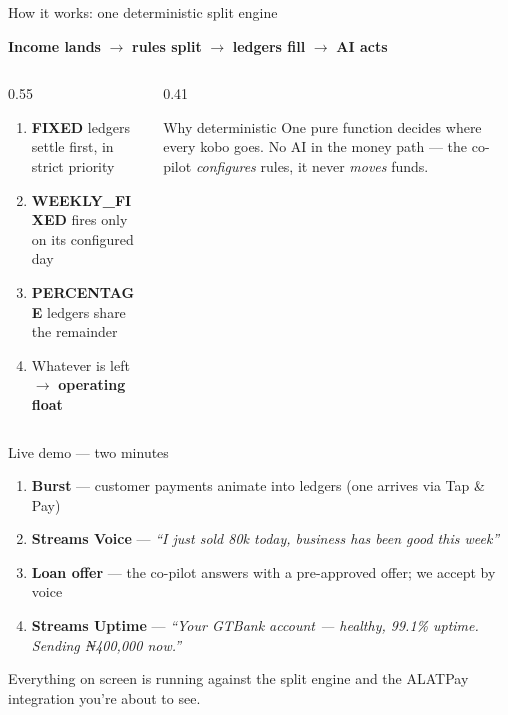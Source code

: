 \documentclass[aspectratio=169,11pt]{beamer}
\newcommand{\mutedtext}[1]{{\color{muted}#1}}
\begin{document}
\begin{frame}{How it works: one deterministic split engine}
  \vspace{0.2cm}
  \begin{center}
    {\large \textbf{Income lands} \;\alert{$\rightarrow$}\; \textbf{rules split} \;\alert{$\rightarrow$}\; \textbf{ledgers fill} \;\alert{$\rightarrow$}\; \textbf{AI acts}\par}
  \end{center}
  \vspace{0.4cm}
  \begin{columns}[T]
    \begin{column}{0.55\textwidth}
      \begin{enumerate}
        \item \textbf{FIXED} ledgers settle first, in strict priority
        \item \textbf{WEEKLY\_FIXED} fires only on its configured day
        \item \textbf{PERCENTAGE} ledgers share the remainder
        \item Whatever is left \(\rightarrow\) \textbf{operating float}
      \end{enumerate}
    \end{column}
    \begin{column}{0.41\textwidth}
      \begin{block}{Why deterministic}
        One pure function decides where every kobo goes. No AI in the money path — the co-pilot \emph{configures} rules, it never \emph{moves} funds.
      \end{block}
    \end{column}
  \end{columns}
\end{frame}

\begin{frame}{Live demo — two minutes}
  \vspace{0.2cm}
  \begin{enumerate}
    \item \textbf{Burst} — customer payments animate into ledgers \mutedtext{(one arrives via Tap \& Pay)}
    \item \textbf{Streams Voice} — \emph{``I just sold 80k today, business has been good this week''}
    \item \textbf{Loan offer} — the co-pilot answers with a pre-approved offer; we accept by voice
    \item \textbf{Streams Uptime} — \emph{``Your GTBank account — healthy, 99.1\% uptime. Sending ₦400,000 now.''}
  \end{enumerate}
  \vspace{0.4cm}
  \mutedtext{Everything on screen is running against the split engine and the ALATPay integration you're about to see.}
\end{frame}
\end{document}
